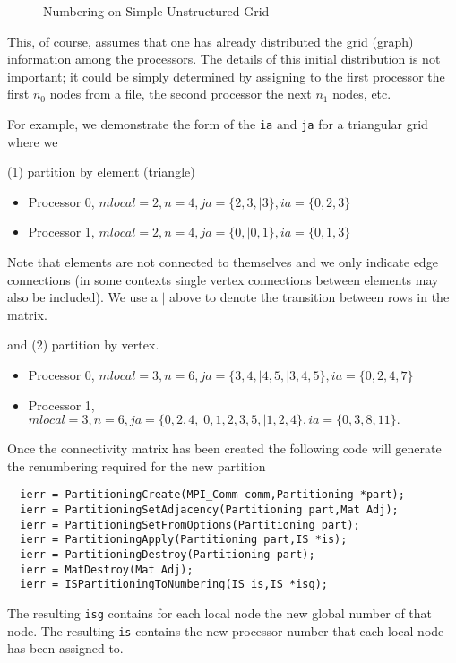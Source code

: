 \begin{figure}[tb]
\centerline{}
\caption{Numbering on Simple Unstructured Grid}
\label{fig:usg}
\end{figure}

This, of course, assumes that one has already distributed the grid (graph) information
among the processors. The details of this initial distribution is not important; it 
could be simply determined by assigning to the first processor the first $n_0$ nodes
from a file, the second processor the next $ n_1$ nodes, etc.

For example, we demonstrate the form of the {\tt ia} and {\tt ja} for a triangular
grid where we 

(1) partition by element (triangle) 
\begin{itemize}
  \item Processor 0, $ mlocal = 2, n = 4, ja = \{2, 3,| 3\}, ia = \{0, 2, 3\} $
  \item Processor 1, $ mlocal = 2, n = 4, ja = \{0, | 0, 1\}, ia = \{0, 1, 3\} $
\end{itemize}
Note that elements are not connected to themselves and we only indicate edge connections
(in some contexts single vertex connections between elements may also be included). We use a
$ | $ above to denote the transition between rows in the matrix.

and (2) partition by vertex.
\begin{itemize}
  \item Processor 0, $ mlocal = 3, n = 6, ja = \{3, 4, | 4, 5, | 3, 4, 5\}, ia = \{0, 2, 4, 7\} $
  \item Processor 1, $ mlocal = 3, n = 6, ja = \{0, 2, 4, |  0, 1, 2, 3, 5,|  1, 2, 4\}, ia = \{0, 3, 8, 11\}. $
\end{itemize}



Once the connectivity matrix has been created the following code will generate the 
renumbering required for the new partition
\begin{verbatim}
  ierr = PartitioningCreate(MPI_Comm comm,Partitioning *part);
  ierr = PartitioningSetAdjacency(Partitioning part,Mat Adj);
  ierr = PartitioningSetFromOptions(Partitioning part);
  ierr = PartitioningApply(Partitioning part,IS *is);
  ierr = PartitioningDestroy(Partitioning part); 
  ierr = MatDestroy(Mat Adj);
  ierr = ISPartitioningToNumbering(IS is,IS *isg);
\end{verbatim}
The   
  
  resulting {\tt isg} contains for each local node the new global
number of that node. The resulting {\tt is} contains the new processor number
that each local node has been assigned to.

